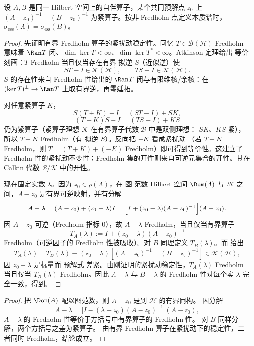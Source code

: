 \begin{theorem}[紧预解式差保持本质谱]
设 $A,B$ 是同一 Hilbert 空间上的自伴算子，某个共同预解点 $z_0$ 上 $(A-z_0)^{-1}-(B-z_0)^{-1}$ 为紧算子。按非 Fredholm 点定义本质谱时，$\sigma_{\mathrm{ess}}(A)=\sigma_{\mathrm{ess}}(B)$。
\end{theorem}
\begin{proof}
先证明有界 Fredholm 算子的紧扰动稳定性。回忆 $T\in\mathcal B(\mathcal H)$ Fredholm
意味着 $\Ran T$ 闭、$\dim\ker T<\infty$、$\dim\ker T^*<\infty$。Atkinson 定理给出
等价刻画：$T$ Fredholm 当且仅当存在有界 拟逆 $S$（近似逆）使
\[
 ST-I\in\mathcal K(\mathcal H),
 \qquad
 TS-I\in\mathcal K(\mathcal H).
\]
$S$ 的存在性来自 Fredholm 性给出的 $\Ran T$ 闭与有限维核/余核：在
$(\ker T)^\perp\to\Ran T$ 上取有界逆，再零延拓。

对任意紧算子 $K$，
\[
 S(T+K)-I=(ST-I)+SK,
\]
\[
 (T+K)S-I=(TS-I)+KS
\]
仍为紧算子（紧算子理想 $\mathcal K$ 在有界算子代数 $\mathcal B$ 中是双侧理想：
$SK$、$KS$ 紧），所以 $T+K$ Fredholm（有 拟逆 $S$）。反向把 $-K$ 看成紧扰动
（若 $T+K$ Fredholm，则 $T=(T+K)+(-K)$ Fredholm）即可得到等价性。这建立了
Fredholm 性的紧扰动不变性；Fredholm 集的开性则来自可逆元集合的开性。其在 Calkin 代数 $\mathcal B/\mathcal K$ 中的开性。

现在固定实数 $\lambda$。因为 $z_0\in\rho(A)$，在 图-范数 Hilbert 空间 $\Dom(A)$
与 $\mathcal H$ 之间，$A-z_0$ 是有界可逆映射，并有分解
\[
 A-\lambda
 =(A-z_0)+(z_0-\lambda)I
 =\Bigl[I+(z_0-\lambda)(A-z_0)^{-1}\Bigr](A-z_0).
\]
因 $A-z_0$ 可逆（Fredholm 指标 $0$），故 $A-\lambda$ Fredholm，当且仅当有界算子
\[
 T_A(\lambda):=I+(z_0-\lambda)(A-z_0)^{-1}
\]
Fredholm（可逆因子的 Fredholm 性被吸收）。对 $B$ 同理定义 $T_B(\lambda)$。而
 给出
\[
 T_A(\lambda)-T_B(\lambda)
 =(z_0-\lambda)\left[(A-z_0)^{-1}-(B-z_0)^{-1}\right]
 \in\mathcal K(\mathcal H),
\]
因 $z_0-\lambda$ 是标量而 预解式 差紧。由刚证明的紧扰动稳定性，$T_A(\lambda)$
Fredholm 当且仅当 $T_B(\lambda)$ Fredholm。因此 $A-\lambda$ 与 $B-\lambda$ 的
Fredholm 性对每个实 $\lambda$ 完全一致，得到。
\end{proof}

\begin{proof}
把 $\Dom(A)$ 配以图范数，则 $A-z_0$ 是到 $\mathcal H$ 的有界同构。
因分解
\[
A-\lambda=
\bigl[I-(\lambda-z_0)(A-z_0)^{-1}\bigr](A-z_0),
\]
$A-\lambda$ 的 Fredholm 性等价于方括号中有界算子的 Fredholm 性。
对 $B$ 同样分解，两个方括号之差为紧算子。
由有界 Fredholm 算子在紧扰动下的稳定性，二者同时 Fredholm，结论成立。
\end{proof}

